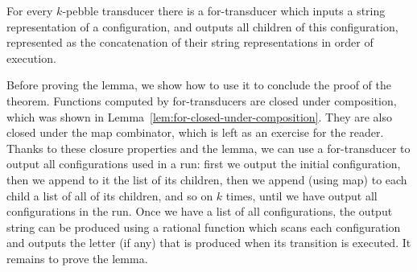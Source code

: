 \begin{lemma}\label{lem:children-of-configuration-in-pebble-run}
    For every $k$-pebble transducer there  is a for-transducer which inputs a string representation of a configuration, and outputs all children of this configuration, represented as the concatenation of their string representations in order of execution. 
\end{lemma}

Before proving the lemma, we show how to use it to conclude the proof of the theorem. Functions computed by for-transducers are closed under composition, which was shown in Lemma~\ref{lem:for-closed-under-composition}. They are also closed under the map combinator, which is left as an exercise for the reader. Thanks to these closure properties and the lemma, we can use a for-transducer to output all configurations used in a run: first we output the initial configuration, then we append to it the list of its children, then we append (using map) to each child a list of all of its children, and so on $k$ times, until we have output all configurations in the run. Once we have a list of all configurations, the output string can be produced using a rational function which scans each configuration and outputs the letter (if any) that is produced when its transition is executed. It remains to prove the lemma.



